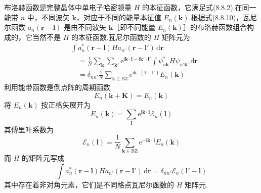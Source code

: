 布洛赫函数是完整晶体中单电子哈密顿量 $H$ 的本征函数，它满足式(8.8.2).在同一能带 $n$ 中，不同波矢 $\boldsymbol{k}$，对应于不同的能量本征值 $E_{n}(\boldsymbol{k})$.根据式(8.8.10)，瓦尼尔函数 $a_{n}(\boldsymbol{r}-\boldsymbol{l})$ 是由不同波矢 $\boldsymbol{k}$［即不同能量 $E_{n}(\boldsymbol{k})$］的布洛赫函数组合构成的，它当然不是 $H$ 的本征函数.瓦尼尔函数的 $H$ 矩阵元为
\begin{equation}
\begin{aligned}
  &\int a_{n}^{*}(\boldsymbol{r}-\boldsymbol{l})Ha_{n'}(\boldsymbol{r}-\boldsymbol{l}')\,\mathrm{d}\boldsymbol{r}\\
  &\quad=\frac{1}{N}\sum_{\boldsymbol{k}}\sum_{\boldsymbol{k}'}
  \mathrm{e}^{\mathrm{i}\boldsymbol{k}\cdot\boldsymbol{l}-\mathrm{i}\boldsymbol{k}'\cdot\boldsymbol{l}'}
  \int\psi_{n\boldsymbol{k}}^{*}H\psi_{n'\boldsymbol{k}'}\,\mathrm{d}\boldsymbol{r}\\
  &\quad=\delta_{nn'}\frac{1}{N}\sum_{\boldsymbol{k}\in\mathrm{BZ}}\mathrm{e}^{\mathrm{i}\boldsymbol{k}\cdot(\boldsymbol{l}-\boldsymbol{l}')}E_{n}(\boldsymbol{k})
\end{aligned}
\end{equation}
利用能带函数是倒点阵的周期函数
\begin{equation}
  E_{n}(\boldsymbol{k}+\boldsymbol{K})=E_{n}(\boldsymbol{k})
\end{equation}
将 $E_{n}(\boldsymbol{k})$ 按正格矢展开为
\begin{equation}
  E_{n}(\boldsymbol{k})=\sum_{\boldsymbol{l}}\mathrm{e}^{\mathrm{i}\boldsymbol{k}\cdot\boldsymbol{l}}\mathscr{E}_{n}(\boldsymbol{l})
\end{equation}
其傅里叶系数为
\begin{equation}
  \mathscr{E}_{n}(\boldsymbol{l})=\frac{1}{N}\sum_{\boldsymbol{k}\in\mathrm{BZ}}\mathrm{e}^{-\mathrm{i}\boldsymbol{k}\cdot\boldsymbol{l}}E_{n}(\boldsymbol{k})
\end{equation}
而 $H$ 的矩阵元写成
\begin{equation}
  \int a_{n}^{*}(\boldsymbol{r}-\boldsymbol{l})Ha_{n'}(\boldsymbol{r}-\boldsymbol{l}')\,\mathrm{d}\boldsymbol{r}
  =\delta_{nn'}\mathscr{E}_{n}(\boldsymbol{l}'-\boldsymbol{l})
\end{equation}
其中存在着非对角元素，它们是不同格点瓦尼尔函数的 $H$ 矩阵元.

